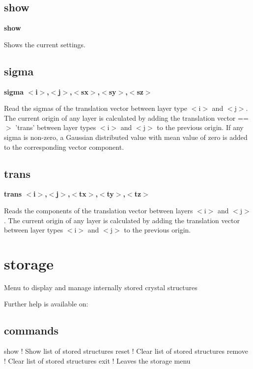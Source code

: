 \subsection*{show}
{\bf show \par }
\par
\vspace{3pt}
Shows the current settings. 
\subsection*{sigma}
{\bf sigma $ <$i$> $,$ <$j$> $,$ <$sx$> $,$ <$sy$> $,$ <$sz$> $ \par }
\par
\vspace{3pt}
Read the sigmas of the translation vector between layer type $ <$i$> $ and $ <$j$> $. 
The current origin of any layer is calculated by adding the translation 
vector ==$> $ 'trans' between layer types $ <$i$> $ and $ <$j$> $ to the previous origin. 
If any sigma is non-zero, a Gaussian distributed value with mean value of 
zero is added to the corresponding vector component. 
\subsection*{trans}
{\bf trans $ <$i$> $,$ <$j$> $,$ <$tx$> $,$ <$ty$> $,$ <$tz$> $ \par }
\par
\vspace{3pt}
Reads the components of the translation vector between layers $ <$i$> $ and $ <$j$> $. 
The current origin of any layer is calculated by adding the translation 
vector between layer types $ <$i$> $ and $ <$j$> $ to the previous origin. 
\section{storage}
\par
Menu to display and manage internally stored crystal structures 
\par
Further help is available on: 
\subsection*{commands}
\begin{MacVerbatim}
show       ! Show list of stored structures
reset      ! Clear list of stored structures
remove     ! Clear list of stored structures
exit       ! Leaves the storage menu
\end{MacVerbatim}
